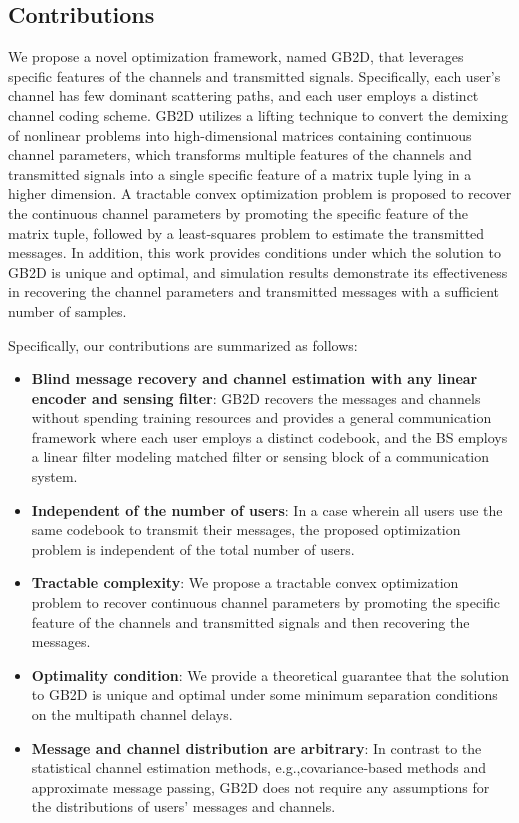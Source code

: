 \documentclass[conference,10pt]{IEEEtran}
\theoremstyle{remark}
\theoremstyle{plain}
\theoremstyle{definition}
\theoremstyle{remark}
\begin{document}
\subsection{Contributions}

We propose a novel optimization framework, named \ac{GB2D}, that leverages specific features of the channels and transmitted signals. Specifically, each user's channel has few dominant scattering paths, and each user employs a distinct channel coding scheme. \ac{GB2D} utilizes a lifting technique to convert the demixing of nonlinear problems into high-dimensional matrices containing continuous channel parameters, which transforms multiple features of the channels and transmitted signals into a single specific feature of a matrix tuple lying in a higher dimension. A tractable convex optimization problem is proposed to recover the continuous channel parameters by promoting the specific feature of the matrix tuple, followed by a least-squares problem to estimate the transmitted messages. In addition, this work provides conditions under which the solution to \ac{GB2D} is unique and optimal, and simulation results demonstrate its effectiveness in recovering the channel parameters and transmitted messages with a sufficient number of samples.

Specifically, our contributions are summarized as follows:

\begin{itemize}
    \item \textbf{Blind message recovery and channel estimation with any linear encoder and sensing filter}:  \ac{GB2D} recovers the messages and channels without spending training resources and provides a general communication framework where each user employs a distinct codebook, and the \ac{BS} employs a linear filter modeling matched filter or sensing block of a communication system. 
    \item \textbf{Independent of the number of users}: In a case wherein all users use the same codebook to transmit their messages, the proposed optimization problem is independent of the total number of users.
    \item \textbf{Tractable complexity}: We propose a tractable convex optimization problem to recover continuous channel parameters by promoting the specific feature of the channels and transmitted signals and then recovering the messages. 
    \item  \textbf{Optimality condition}: We provide a theoretical guarantee that the solution to \ac{GB2D} is unique and optimal under some minimum separation conditions on the multipath channel delays. 
    \item \textbf{Message and channel distribution are arbitrary}: In contrast to the statistical channel estimation methods, e.g.,covariance-based methods and approximate message passing,  \ac{GB2D} does not require any assumptions for the distributions of users' messages and channels.
\end{itemize}
\end{document}
